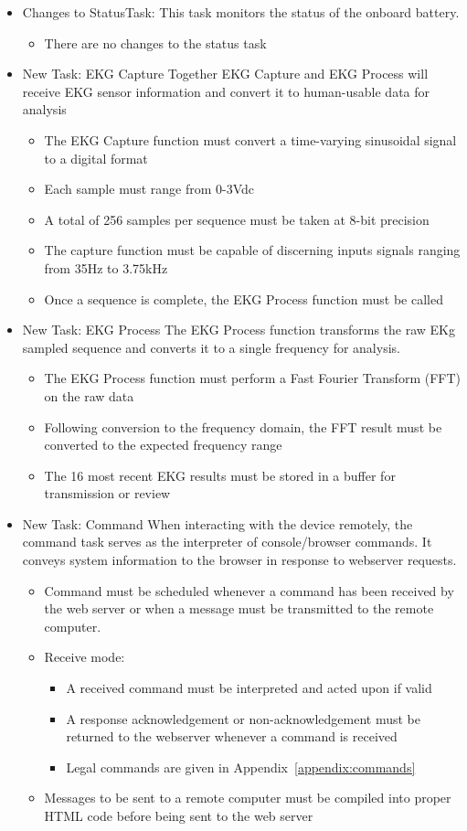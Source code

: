 \documentclass[12pt]{article} %
\begin{document}
\begin{itemize}
  \item Changes to StatusTask:
		This task monitors the status of the onboard battery.
    \begin{itemize}
      \item There are no changes to the status task
    \end{itemize}
	\item New Task: EKG Capture
		Together EKG Capture and EKG Process will receive EKG sensor information
		and convert it to human-usable data for analysis
		\begin{itemize}
			\item The EKG Capture function must convert a time-varying sinusoidal signal to a digital format
			\item Each sample must range from 0-3Vdc
			\item A total of 256 samples per sequence must be taken at 8-bit precision
			\item The capture function must be capable of discerning inputs signals ranging from 35Hz to 3.75kHz
			\item Once a sequence is complete, the EKG Process function must be called
		\end{itemize}
	\item New Task: EKG Process
		The EKG Process function transforms the raw EKg sampled sequence and
		converts it to a single frequency for analysis.
		\begin{itemize}
			\item The EKG Process function must perform a Fast Fourier Transform (FFT) on the raw data
			\item Following conversion to the frequency domain, the FFT result must be converted to the expected frequency range
			\item The 16 most recent EKG results must be stored in a buffer for transmission or review
		\end{itemize}
	\item New Task: Command
		When interacting with the device remotely, the command task serves as the interpreter of console/browser commands. It conveys system information to the browser in response to webserver requests.
		\begin{itemize}
			\item Command must be scheduled whenever a command has been received by
				the web server or when a message must be transmitted to the remote
				computer.
			\item Receive mode:
				\begin{itemize}
					\item A received command must be interpreted and acted upon if valid
					\item A response acknowledgement or non-acknowledgement must be
						returned to the webserver whenever a command is received
					\item Legal commands are given in Appendix~\ref{appendix:commands}
				\end{itemize}
			\item Messages to be sent to a remote computer must be compiled into proper HTML code before being sent to the web server
		\end{itemize}


\end{itemize}
\end{document}
